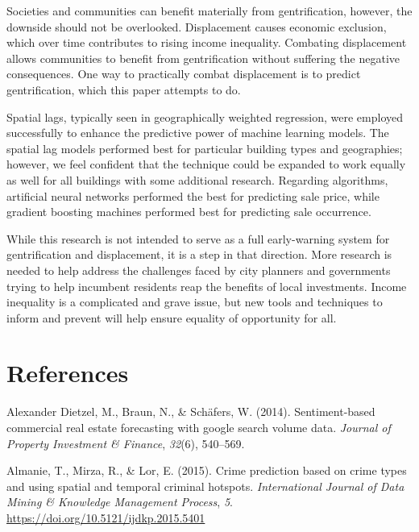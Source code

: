 \documentclass[12pt,]{article}
\begin{document}
Societies and communities can benefit materially from gentrification,
however, the downside should not be overlooked. Displacement causes
economic exclusion, which over time contributes to rising income
inequality. Combating displacement allows communities to benefit from
gentrification without suffering the negative consequences. One way to
practically combat displacement is to predict gentrification, which this
paper attempts to do.

Spatial lags, typically seen in geographically weighted regression, were
employed successfully to enhance the predictive power of machine
learning models. The spatial lag models performed best for particular
building types and geographies; however, we feel confident that the
technique could be expanded to work equally as well for all buildings
with some additional research. Regarding algorithms, artificial neural
networks performed the best for predicting sale price, while gradient
boosting machines performed best for predicting sale occurrence.

While this research is not intended to serve as a full early-warning
system for gentrification and displacement, it is a step in that
direction. More research is needed to help address the challenges faced
by city planners and governments trying to help incumbent residents reap
the benefits of local investments. Income inequality is a complicated
and grave issue, but new tools and techniques to inform and prevent will
help ensure equality of opportunity for all.

\newpage

\hypertarget{references}{%
\section*{References}\label{references}}

\hypertarget{refs}{}
\leavevmode\hypertarget{ref-Dietzell2014}{}%
Alexander Dietzel, M., Braun, N., \& Schäfers, W. (2014).
Sentiment-based commercial real estate forecasting with google search
volume data. \emph{Journal of Property Investment \& Finance},
\emph{32}(6), 540--569.

\leavevmode\hypertarget{ref-Almanie2015}{}%
Almanie, T., Mirza, R., \& Lor, E. (2015). Crime prediction based on
crime types and using spatial and temporal criminal hotspots.
\emph{International Journal of Data Mining \& Knowledge Management
Process}, \emph{5}. \url{https://doi.org/10.5121/ijdkp.2015.5401}
\end{document}
